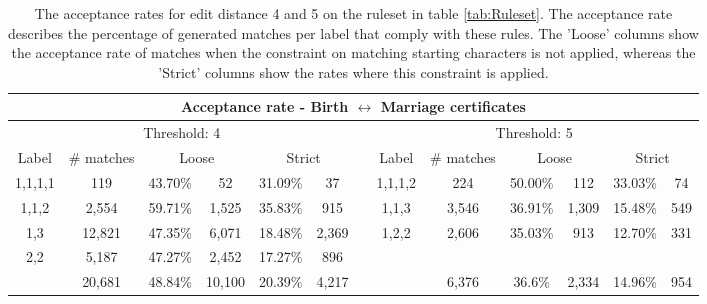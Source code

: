 \begin{table}
	\begin{center}
		\caption[Acceptance rate]{\label{tab:acceptance_rate} The acceptance rates for edit distance 4 and 5 on the ruleset in table \ref{tab:Ruleset}. The acceptance rate describes the percentage of generated matches per label that comply with these rules. The 'Loose' columns show the acceptance rate of matches when the constraint on matching starting characters is not applied, whereas the 'Strict' columns show the rates where this constraint is applied. }
		\vspace{0.5cm}
		\resizebox{\columnwidth}{!} {
			\begin{tabular}{*{13}{c}}
				\toprule
				\multicolumn{13}{c}{Acceptance rate - Birth $\leftrightarrow$ Marriage  certificates}\\
				\midrule
				\multicolumn{6}{c}{Threshold: 4} && \multicolumn{6}{c}{Threshold: 5}\\
				\cmidrule{1-6} \cmidrule{8-13}
				Label 	& \# matches & \multicolumn{2}{c}{Loose}	& \multicolumn{2}{c}{Strict} && Label 	& \# matches & \multicolumn{2}{c}{Loose}	& \multicolumn{2}{c}{Strict} \\
				\cmidrule{1-2} \cmidrule{3-4} \cmidrule{5-6} \cmidrule{8-13} 
				1,1,1,1 & 119 		& 43.70\% & 52 		& 31.09\% 	& 37 	&& 1,1,1,2 	& 224		& 50.00\% 	& 112	& 33.03\% & 74	\\
				1,1,2 	& 2,554 	& 59.71\% & 1,525 	& 35.83\% 	& 915 	&& 1,1,3 	& 3,546		& 36.91\% 	& 1,309	& 15.48\% &	549 \\
				1,3 	& 12,821 	& 47.35\% & 6,071 	& 18.48\% 	& 2,369	&& 1,2,2 	& 2,606		& 35.03\%	& 913 	& 12.70\% & 331 \\
				2,2 	& 5,187 	& 47.27\% & 2,452 	& 17.27\% 	& 896	&&  		& 	&   	& 	&   &  \\
				\midrule
						& 20,681	& 48.84\% & 10,100 	& 20.39\%	& 4,217	&&			& 6,376	& 36.6\%	& 2,334 & 14.96\% & 954\\
				\bottomrule
			\end{tabular}
		}
		\bigskip
		

\end{center}
\end{table}

